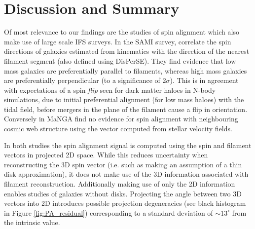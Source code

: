 \section{Discussion and Summary} \label{sec:cw_spin_conclusion}


Of most relevance to our findings are the studies of spin alignment which also make use of large scale IFS surveys. In the SAMI survey, \citet{welker2020} correlate the spin directions of galaxies estimated from kinematics with the direction of the nearest filament segment (also defined using DisPerSE). They find evidence that low mass galaxies are preferentially parallel to filaments, whereas high mass galaxies are preferentially perpendicular (to a significance of 2$\sigma$). This is in agreement with expectations of a spin \textit{flip} seen for dark matter haloes in N-body simulations, due to initial preferential alignment (for low mass haloes) with the tidal field, before mergers in the plane of the filament cause a flip in orientation. Conversely in MaNGA \citet{krolewski2019} find no evidence for spin alignment with neighbouring cosmic web structure using the vector computed from stellar velocity fields. 

In both studies the spin alignment signal is computed using the spin and filament vectors in projected 2D space. While this reduces uncertainty when reconstructing the 3D spin vector (i.e. such as making an assumption of a thin disk approximation), it does not make use of the 3D information associated with filament reconstruction. Additionally making use of only the 2D information enables studies of galaxies without disks. Projecting the angle between two 3D vectors into 2D introduces possible projection degeneracies (see black histogram in Figure \ref{fig:PA_residual}) corresponding to a standard deviation of $\sim 13^{\circ}$ from the intrinsic value.

